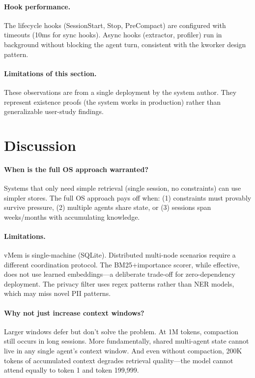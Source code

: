\documentclass[10pt,twocolumn]{article}
\begin{document}
\paragraph{Hook performance.} The lifecycle hooks (SessionStart, Stop, PreCompact) are configured with timeouts (10ms for sync hooks). Async hooks (extractor, profiler) run in background without blocking the agent turn, consistent with the kworker design pattern.

\paragraph{Limitations of this section.} These observations are from a single deployment by the system author. They represent existence proofs (the system works in production) rather than generalizable user-study findings.

\section{Discussion}
\label{sec:discussion}

\paragraph{When is the full OS approach warranted?} Systems that only need simple retrieval (single session, no constraints) can use simpler stores. The full OS approach pays off when: (1) constraints must provably survive pressure, (2) multiple agents share state, or (3) sessions span weeks/months with accumulating knowledge.

\paragraph{Limitations.} vMem is single-machine (SQLite). Distributed multi-node scenarios require a different coordination protocol. The BM25+importance scorer, while effective, does not use learned embeddings---a deliberate trade-off for zero-dependency deployment. The privacy filter uses regex patterns rather than NER models, which may miss novel PII patterns.

\paragraph{Why not just increase context windows?} Larger windows defer but don't solve the problem. At 1M tokens, compaction still occurs in long sessions. More fundamentally, shared multi-agent state cannot live in any single agent's context window. And even without compaction, 200K tokens of accumulated context degrades retrieval quality---the model cannot attend equally to token 1 and token 199{,}999.
\end{document}

